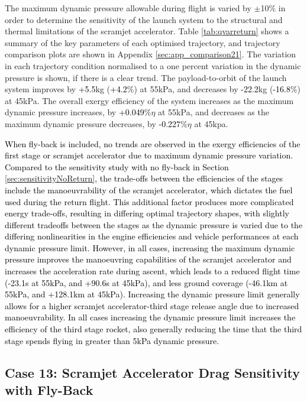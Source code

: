 \noindent
The maximum dynamic pressure allowable during flight is varied by $\pm$10\% in order to determine the sensitivity of the launch system to the structural and thermal limitations of the scramjet accelerator.  
Table \ref{tab:qvarreturn} shows a summary of the key parameters of each optimised trajectory, and trajectory comparison plots are shown in Appendix \ref{sec:app_comparison21}. The variation in each trajectory condition normalised to a one percent variation in the dynamic pressure is shown, if there is a clear trend. The payload-to-orbit of the launch system improves by \textcolor{black}{+5.5}kg (\textcolor{black}{+4.2}\%) at 55kPa, and decreases by \textcolor{black}{-22.2}kg (\textcolor{black}{-16.8}\%) at 45kPa.
The overall exergy efficiency of the system increases as the maximum dynamic pressure increases, by \textcolor{black}{+0.049}\%$\eta$ at 55kPa, and decreases as the maximum dynamic pressure decreases, by \textcolor{black}{-0.227}\%$\eta$ at 45kpa. 

\textcolor{black}{
When fly-back is included, no trends are observed in the exergy efficiencies of the first stage or scramjet accelerator due to maximum dynamic pressure variation. Compared to the sensitivity study with no fly-back in Section \ref{sec:sensitivityNoReturn}, the trade-offs between the efficiencies of the stages include the manoeuvrability of the scramjet accelerator, which dictates the fuel used during the return flight. This additional factor produces more complicated energy trade-offs, resulting in differing optimal trajectory shapes, with slightly different tradeoffs between the stages as the dynamic pressure is varied due to the differing nonlinearities in the engine efficiencies and vehicle performances at each dynamic pressure limit.
However, in all cases, increasing the maximum dynamic pressure improves the manoeuvring capabilities of the scramjet accelerator and increases the acceleration rate during ascent, which leads to a reduced flight time (-23.1s at 55kPa, and +90.6s at 45kPa), and less ground coverage (-46.1km at 55kPa, and +128.1km at 45kPa). Increasing the dynamic pressure limit generally allows for a higher scramjet accelerator-third stage release angle due to increased manoeuvrability. In all cases increasing the dynamic pressure limit increases the efficiency of the third stage rocket, also generally reducing the time that the third stage spends flying in greater than 5kPa dynamic pressure. }


\subsection{Case 13: Scramjet Accelerator Drag Sensitivity with Fly-Back}\label{sec:dragvar}



